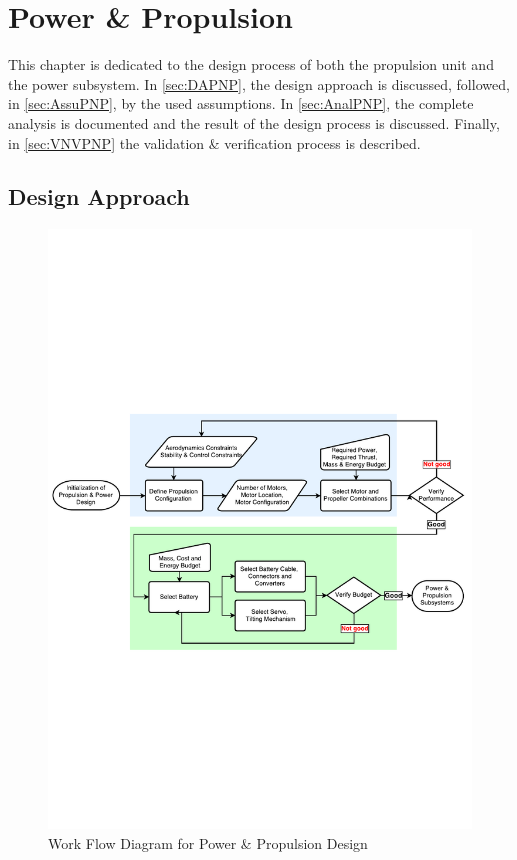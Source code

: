 \chapter{Power \& Propulsion}
\setlength{\parindent}{15pt}
\label{ch:powe_prop}

This chapter is dedicated to the design process of both the propulsion unit and the power subsystem. In \autoref{sec:DAPNP}, the design approach is discussed, followed, in \autoref{sec:AssuPNP}, by the used assumptions. In \autoref{sec:AnalPNP}, the complete analysis is documented and the result of the design process is discussed. Finally, in \autoref{sec:VNVPNP} the validation \& verification process is described.

\section{Design Approach}
\label{sec:DAPNP}

\begin{figure}[H]
    \centering
    \includegraphics[width=1.0\textwidth]{PowerPropulsion/Figures/pnpwfd.pdf}
    \caption{Work Flow Diagram for Power \& Propulsion Design}
    \label{fig:wfdpnp}
\end{figure}

